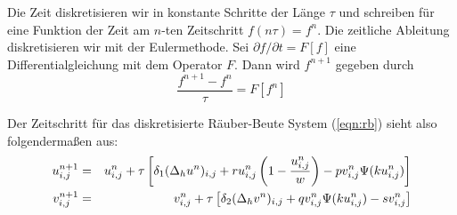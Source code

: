 \documentclass{exam}
\begin{document}
Die Zeit diskretisieren wir in konstante Schritte der Länge $\tau$ und schreiben
für eine Funktion der Zeit am $n$-ten Zeitschritt $f(n \tau) = f^n$. Die zeitliche Ableitung diskretisieren
wir mit der Eulermethode. Sei $\partial f/\partial t = F[f]$ eine Differentialgleichung
mit dem Operator $F$. Dann wird $f^{n+1}$ gegeben durch
\begin{equation}
\label{eqn:dtime}
\frac{f^{n+1} - f^{n}}{\tau} = F[f^{n}]
\end{equation}


Der Zeitschritt für das diskretisierte Räuber-Beute System (\ref{eqn:rb}) sieht also folgendermaßen aus:
\begin{eqnarray}
\label{eqn:drb}
u_{i,j}^{n+1}  &=& u_{i,j}^n + \tau \left[ \delta_1 (\Delta_h u^n)_{i,j} + r u^n_{i,j} \left(1 - \frac{u^n_{i,j}}{w} \right) - p v^n_{i,j} \Psi(k u^n_{i,j}) \right] \\
v_{i,j}^{n+1}  &=& v_{i,j}^n + \tau \left[ \delta_2 (\Delta_h v^n)_{i,j} + q v^n_{i,j} \Psi(k u^n_{i,j}) - s v^n_{i,j} \right] \notag 
\end{eqnarray}

\clearpage
\end{document}
